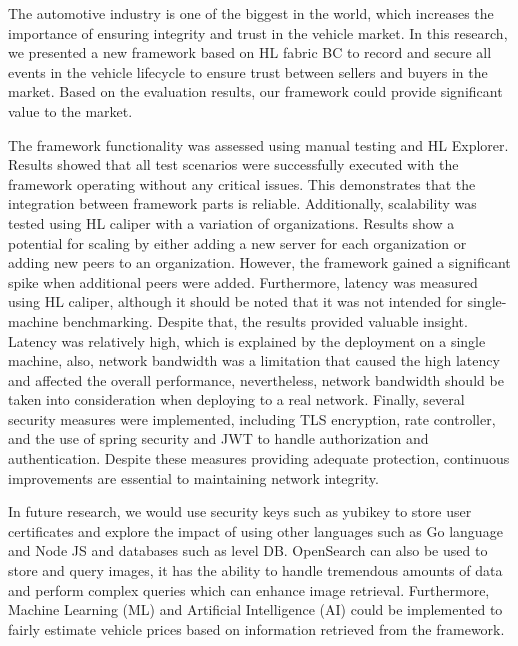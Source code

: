 The automotive industry is one of the biggest in the world, which increases the importance of ensuring integrity and trust in the vehicle
market. In this research, we presented a new framework based on HL fabric BC to record and secure all events in the vehicle lifecycle to
ensure trust between sellers and buyers in the market. Based on the evaluation results, our framework could provide significant value to the
market.

The framework functionality was assessed using manual testing and HL Explorer. Results showed that all test scenarios were successfully
executed with the framework operating without any critical issues. This demonstrates that the integration between framework parts is
reliable. Additionally, scalability was tested using HL caliper with a variation of organizations. Results show a potential for scaling by
either adding a new server for each organization or adding new peers to an organization. However, the framework gained a significant spike
when additional peers were added. Furthermore, latency was measured using HL caliper, although it should be noted that it was not intended
for single-machine benchmarking. Despite that, the results provided valuable insight. Latency was relatively high, which is explained by the
deployment on a single machine, also, network bandwidth was a limitation that caused the high latency and affected the overall performance,
nevertheless, network bandwidth should be taken into consideration when deploying to a real network. Finally, several security measures were
implemented, including TLS encryption, rate controller, and the use of spring security and JWT to handle authorization and authentication.
Despite these measures providing adequate protection, continuous improvements are essential to maintaining network integrity.

In future research, we would use security keys such as yubikey to store user certificates and explore the impact of using other languages
such as Go language and Node JS and databases such as level DB. OpenSearch can also be used to store and query images, it has the ability to
handle tremendous amounts of data and perform complex queries which can enhance image retrieval. Furthermore, Machine Learning (ML) and
Artificial Intelligence (AI) could be implemented to fairly estimate vehicle prices based on information retrieved from the framework.